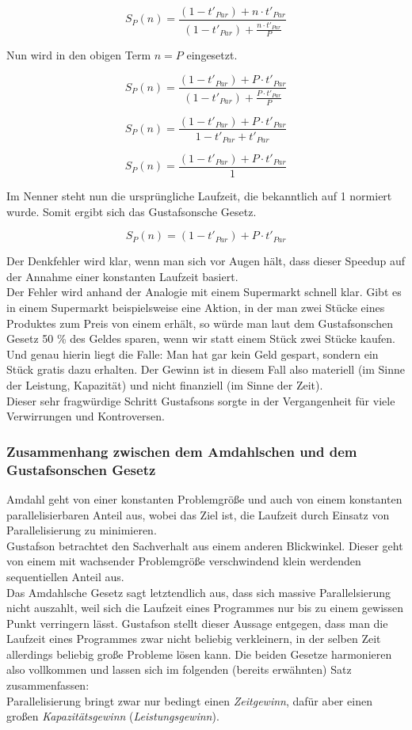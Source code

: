				\[ S_P(n) = \frac{(1 - t'_{Par}) + n \cdot t'_{Par}}{(1 - t'_{Par}) + \frac{n \cdot t'_{Par}}{P}} \]
				
				Nun wird in den obigen Term $n = P$ eingesetzt.
				
				\[ S_P(n) = \frac{(1 - t'_{Par}) + P \cdot t'_{Par}}{(1 - t'_{Par}) + \frac{P \cdot t'_{Par}}{P}} \]
				
				\[ S_P(n) = \frac{(1 - t'_{Par}) + P \cdot t'_{Par}}{1 - t'_{Par} + t'_{Par}} \]
				
				\[ S_P(n) = \frac{(1 - t'_{Par}) + P \cdot t'_{Par}}{1} \]
				
				Im Nenner steht nun die ursprüngliche Laufzeit, die bekanntlich auf 1 normiert wurde. Somit ergibt sich das Gustafsonsche Gesetz.
				
				\[ S_P(n) = (1 - t'_{Par}) + P \cdot t'_{Par} \]
				
				Der Denkfehler wird klar, wenn man sich vor Augen hält, dass dieser Speedup auf der Annahme einer konstanten Laufzeit basiert.\\
				Der Fehler wird anhand der Analogie mit einem Supermarkt schnell klar. Gibt es in einem Supermarkt beispielsweise eine Aktion, in der man zwei Stücke eines Produktes zum Preis von einem erhält, so würde man laut dem Gustafsonschen Gesetz 50 \% des Geldes sparen, wenn wir statt einem Stück zwei Stücke kaufen. Und genau hierin liegt die Falle: Man hat gar kein Geld gespart, sondern ein Stück gratis dazu erhalten. Der Gewinn ist in diesem Fall also materiell (im Sinne der Leistung, Kapazität) und nicht finanziell (im Sinne der Zeit).\\
				Dieser sehr fragwürdige Schritt Gustafsons sorgte in der Vergangenheit für viele Verwirrungen und Kontroversen. \cite{GustafsonsGesetzWikipedia} \cite{GesetzeParallelierung}
			
			\subsubsection{Zusammenhang zwischen dem Amdahlschen und dem Gustafsonschen Gesetz}
				 
				 Amdahl geht von einer konstanten Problemgröße und auch von einem konstanten parallelisierbaren Anteil aus, wobei das Ziel ist, die Laufzeit durch Einsatz von Parallelisierung zu minimieren.\\
				 Gustafson betrachtet den Sachverhalt aus einem anderen Blickwinkel. Dieser geht von einem mit wachsender Problemgröße verschwindend klein werdenden sequentiellen Anteil aus.\\
				 Das Amdahlsche Gesetz sagt letztendlich aus, dass sich massive Parallelsierung nicht auszahlt, weil sich die Laufzeit eines Programmes nur bis zu einem gewissen Punkt verringern lässt. Gustafson stellt dieser Aussage entgegen, dass man die Laufzeit eines Programmes zwar nicht beliebig verkleinern, in der selben Zeit allerdings beliebig große Probleme lösen kann. Die beiden Gesetze harmonieren also vollkommen und lassen sich im folgenden (bereits erwähnten) Satz zusammenfassen:\\
				 Parallelisierung bringt zwar nur bedingt einen \textit{Zeitgewinn}, dafür aber einen großen \textit{Kapazitätsgewinn} (\textit{Leistungsgewinn}). \cite{GesetzeParallelierung}